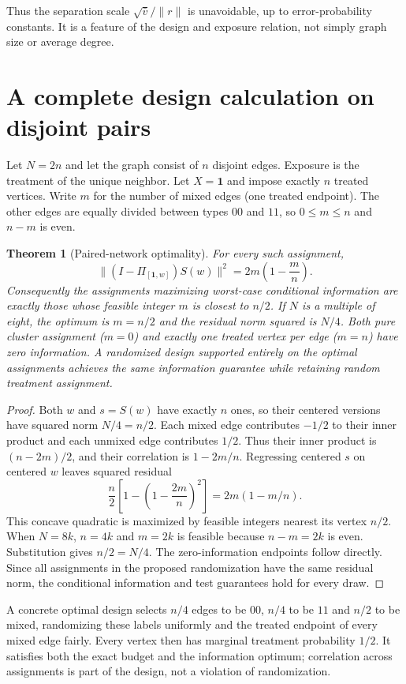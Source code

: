 \documentclass[11pt]{article}
\newtheorem{theorem}{Theorem}
\theoremstyle{remark}\newtheorem{remark}[theorem]{Remark}
\begin{document}
Thus the separation scale $\sqrt{\bar v}/\|r\|$ is unavoidable, up to error-probability constants. It is a feature of the design and exposure relation, not simply graph size or average degree.

\section*{A complete design calculation on disjoint pairs}
Let $N=2n$ and let the graph consist of $n$ disjoint edges. Exposure is the treatment of the unique neighbor. Let $X=\mathbf1$ and impose exactly $n$ treated vertices. Write $m$ for the number of mixed edges (one treated endpoint). The other edges are equally divided between types $00$ and $11$, so $0\le m\le n$ and $n-m$ is even.

\begin{theorem}[Paired-network optimality]
For every such assignment,
\[
 \|(I-\Pi_{[\mathbf1,w]})S(w)\|^2
 =2m\left(1-\frac mn\right).
\]
Consequently the assignments maximizing worst-case conditional information are exactly those whose feasible integer $m$ is closest to $n/2$. If $N$ is a multiple of eight, the optimum is $m=n/2$ and the residual norm squared is $N/4$. Both pure cluster assignment ($m=0$) and exactly one treated vertex per edge ($m=n$) have zero information. A randomized design supported entirely on the optimal assignments achieves the same information guarantee while retaining random treatment assignment.
\end{theorem}
\begin{proof}
Both $w$ and $s=S(w)$ have exactly $n$ ones, so their centered versions have squared norm $N/4=n/2$. Each mixed edge contributes $-1/2$ to their inner product and each unmixed edge contributes $1/2$. Thus their inner product is $(n-2m)/2$, and their correlation is $1-2m/n$. Regressing centered $s$ on centered $w$ leaves squared residual
\[
 \frac n2\left[1-\left(1-\frac{2m}n\right)^2\right]
 =2m(1-m/n).
\]
This concave quadratic is maximized by feasible integers nearest its vertex $n/2$. When $N=8k$, $n=4k$ and $m=2k$ is feasible because $n-m=2k$ is even. Substitution gives $n/2=N/4$. The zero-information endpoints follow directly. Since all assignments in the proposed randomization have the same residual norm, the conditional information and test guarantees hold for every draw.
\end{proof}

A concrete optimal design selects $n/4$ edges to be $00$, $n/4$ to be $11$ and $n/2$ to be mixed, randomizing these labels uniformly and the treated endpoint of every mixed edge fairly. Every vertex then has marginal treatment probability $1/2$. It satisfies both the exact budget and the information optimum; correlation across assignments is part of the design, not a violation of randomization.
\end{document}
